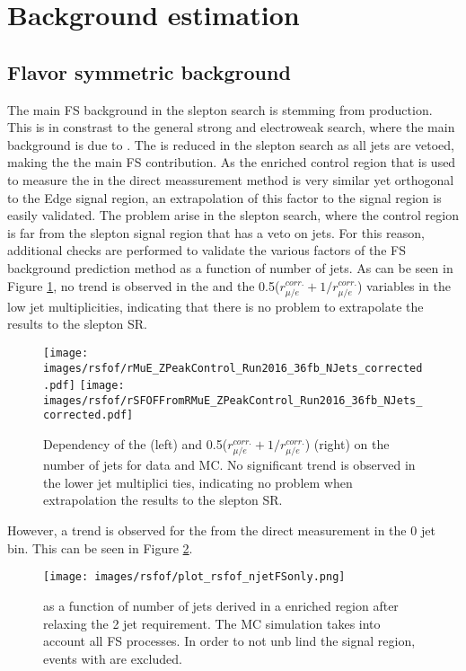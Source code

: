 \section{Background estimation}
\subsection*{Flavor symmetric background}
\noindent
\justify
The main FS background in the slepton search is stemming from \PWW production.
This is in constrast to the general strong and electroweak search, where the main background is due to \ttbar.
The \ttbar is reduced in the slepton search as all jets are vetoed, making the \PWW the main FS contribution.
As the \ttbar enriched control region that is used to measure the \Rsfof in the direct meassurement method is very similar yet orthogonal to the Edge signal region, an extrapolation of this factor to     the signal region is easily validated.
The problem arise in the slepton search, where the \ttbar control region is far from the slepton signal region that has a veto on jets.
For this reason, additional checks are performed to validate the various factors of the FS background prediction method as a function of number of jets.
As can be seen in Figure \ref{fig:rmueSlepton}, no trend is observed in the \rmue and the 0.5($r_{\mu/e}^{corr.}+1/r_{\mu/e}^{corr.}$) variables in the low jet multiplicities, indicating that there is     no problem to extrapolate the results to the slepton SR.
\begin{figure}[htbp!]
\begin{center}
    \texttt{[image: images/rsfof/rMuE\_ZPeakControl\_Run2016\_36fb\_NJets\_corrected.pdf]}
    \texttt{[image: images/rsfof/rSFOFFromRMuE\_ZPeakControl\_Run2016\_36fb\_NJets\_corrected.pdf]}
    \caption{Dependency of the \rmue (left) and 0.5($r_{\mu/e}^{corr.}+1/r_{\mu/e}^{corr.}$) (right) on the number of jets for data and MC. No significant trend is observed in the lower jet multiplici    ties, indicating no problem when extrapolation the results to the slepton SR.}
\label{fig:rmueSlepton}
\end{center}
\end{figure}
However, a trend is observed for the \Rsfof from the direct measurement in the 0 jet bin. This can be seen in Figure \ref{fig:rsfofSleptonOne}.
\begin{figure}[htbp!]
\begin{center}
    \texttt{[image: images/rsfof/plot\_rsfof\_njetFSonly.png]}
    \caption{\Rsfof as a function of number of jets derived in a \ttbar enriched region after relaxing the 2 jet requirement. The MC simulation takes into account all FS processes. In order to not unb    lind the signal region, events with are excluded.}
\label{fig:rsfofSleptonOne}
\end{center}
\end{figure} 

